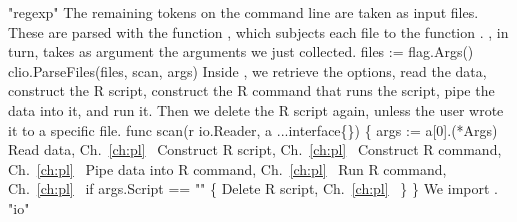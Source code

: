 "regexp"
\nwendcode{}\nwdocspar
The remaining tokens on the command line are taken as input
files. These are parsed with the function , which
subjects each file to the function . , in turn,
takes as argument the arguments we just collected.
\nwenddocs{}\endmoddef\nwstartdeflinemarkup{}\nwenddeflinemarkup
files := flag.Args()
clio.ParseFiles(files, scan, args)
\nwendcode{}\nwdocspar
Inside , we retrieve the options, read the data, construct
the R script, construct the R command that runs the script, pipe the
data into it, and run it. Then we delete the R script again, unless
the user wrote it to a specific file.
\nwenddocs{}\endmoddef\nwstartdeflinemarkup{}\nwenddeflinemarkup
func scan(r io.Reader, a ...interface\{\}) \{
          args := a[0].(*Args)
          \LA{}Read data, Ch.~\ref{ch:pl}~{\nwtagstyle{}}\RA{}
          \LA{}Construct R script, Ch.~\ref{ch:pl}~{\nwtagstyle{}}\RA{}
          \LA{}Construct R command, Ch.~\ref{ch:pl}~{\nwtagstyle{}}\RA{}
          \LA{}Pipe data into R command, Ch.~\ref{ch:pl}~{\nwtagstyle{}}\RA{}
          \LA{}Run R command, Ch.~\ref{ch:pl}~{\nwtagstyle{}}\RA{}
          if args.Script == "" \{
                  \LA{}Delete R script, Ch.~\ref{ch:pl}~{\nwtagstyle{}}\RA{}
          \}
\}
\nwendcode{}\nwdocspar
We import .
\nwenddocs{}\plusendmoddef\nwstartdeflinemarkup{}\nwenddeflinemarkup
"io"
\nwendcode{}\nwdocspar
